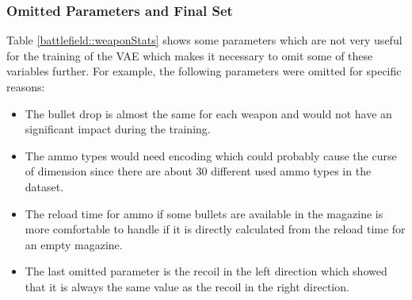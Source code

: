 \documentclass[MGS,Master,english]{twbook}%
\begin{document}
\subsubsection{Omitted Parameters and Final Set}
Table \ref{battlefield::weaponStats} shows some parameters which are not very useful for the training of the \ac{VAE} which makes it necessary to omit some of these variables further. For example, the following parameters were omitted for specific reasons:
\begin{itemize}
	\item The bullet drop is almost the same for each weapon and would not have an significant impact during the training.
	\item The ammo types would need encoding which could probably cause the curse of dimension since there are about 30 different used ammo types in the dataset.
	\item The reload time for ammo if some bullets are available in the magazine is more comfortable to handle if it is directly calculated from the reload time for an empty magazine.
	\item The last omitted parameter is the recoil in the left direction which showed that it is always the same value as the recoil in the right direction.
\end{itemize}
\end{document}
